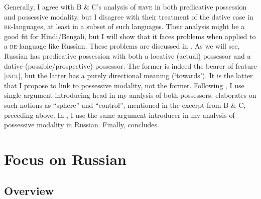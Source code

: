 \documentclass[output=paper,colorlinks,citecolor=brown,nonflat]{./langscibook}
\begin{document}
Generally, I agree with B \& C’s analysis of \textsc{have} in both predicative possession and possessive modality, but I disagree with their treatment of the dative case in \textsc{be}{}-languages, at least in a subset of such languages. Their analysis might be a good fit for Hindi/Bengali, but I will show that it faces problems when applied to a \textsc{be}-language like Russian. These problems are discussed in . As we will see, Russian has predicative possession with both a locative (actual) possessor and a dative (possible/prospective) possessor. The former is indeed the bearer of feature [\textsc{incl}], but the latter has a purely directional meaning (‘towards’). It is the latter that I propose to link to possessive modality, not the former. Following \citet{TsedrykInPress}, I use  single argument-introducing head in my analysis of both possessors.  elaborates on such notions as “sphere” and “control”, mentioned in the excerpt from B \& C, preceding  above. In , I use the same argument introducer in my analysis of possessive modality in Russian. Finally,  concludes. 

\section{ Focus on Russian}\label{sec:tsedryk:2}

\subsection{Overview}\label{sec:tsedryk:2.1}
\end{document}
